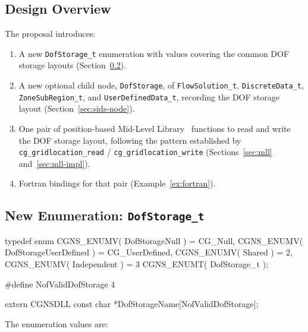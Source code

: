 \documentclass[11pt,letterpaper]{article}
\makeatletter
\let\cgns@orig@lstlisting\lstlisting
\let\cgns@endorig@lstlisting\endlstlisting
\renewenvironment{lstlisting}
  {\par\needspace{5\baselineskip}\nolinenumbers\cgns@orig@lstlisting}
  {\cgns@endorig@lstlisting\par\linenumbers}
\makeatother
\begin{document}
\subsection{Design Overview}

The proposal introduces:

\begin{enumerate}[leftmargin=2em]
\item A new \texttt{DofStorage\_t} enumeration with values
  covering the common DOF storage layouts
  (Section~\ref{sec:enum}).
\item A new optional child node, \texttt{DofStorage}, of
  \texttt{FlowSolution\_t}, \texttt{DiscreteData\_t},
  \texttt{ZoneSubRegion\_t}, and \texttt{UserDefinedData\_t},
  recording the DOF storage layout
  (Section~\ref{sec:sids-node}).
\item One pair of position-based Mid-Level Library~\cite{cgns-mll}
  functions to read and
  write the DOF storage layout, following the pattern established by
  \texttt{cg\_gridlocation\_read} / \texttt{cg\_gridlocation\_write}
  (Sections~\ref{sec:mll} and~\ref{sec:mll-impl}).
\item Fortran bindings for that pair (Example~\ref{ex:fortran}).
\end{enumerate}

\subsection{New Enumeration: \texttt{DofStorage\_t}}
\label{sec:enum}

\begin{lstlisting}[language=C]
typedef enum {
  CGNS_ENUMV( DofStorageNull )        = CG_Null,
  CGNS_ENUMV( DofStorageUserDefined ) = CG_UserDefined,
  CGNS_ENUMV( Shared )                = 2,
  CGNS_ENUMV( Independent )           = 3
} CGNS_ENUMT( DofStorage_t );

#define NofValidDofStorage 4

extern CGNSDLL const char *DofStorageName[NofValidDofStorage];
\end{lstlisting}

The enumeration values are:
\end{document}
